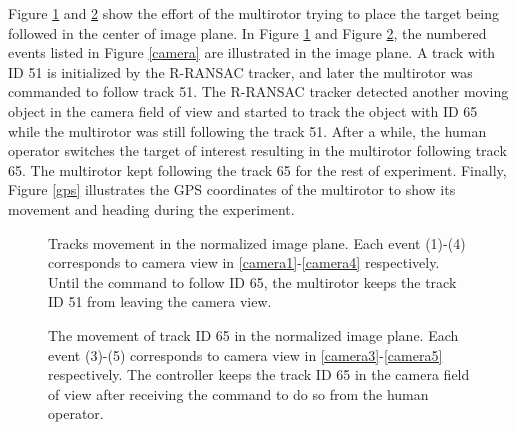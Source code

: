 Figure \ref{image1} and \ref{image2} show the effort of the multirotor trying to place the target being followed in the center of image plane. In Figure \ref{image1} and Figure \ref{image2}, the numbered events listed in Figure \ref{camera} are illustrated in the image plane. A track with ID 51 is initialized by the R-RANSAC tracker, and later the multirotor was commanded to follow track 51. The R-RANSAC tracker detected another moving object in the camera field of view and started to track the object with ID 65 while the multirotor was still following the track 51. After a while, the human operator switches the target of interest resulting in the multirotor following track 65. The multirotor kept following the track 65 for the rest of experiment. Finally, Figure \ref{gps} illustrates the GPS coordinates of the multirotor to show its movement and heading during the experiment. 

\begin{figure}[htbp]
	\centering
	\caption{Tracks movement in the normalized image plane. Each event (1)-(4) corresponds to camera view in \ref{camera1}-\ref{camera4} respectively. Until the command to follow ID 65, the multirotor keeps the track ID 51 from leaving the camera view.}
	\label{image1}
\end{figure}

\begin{figure}[htbp]
	\centering
	\caption{The movement of track ID 65 in the normalized image plane. Each event (3)-(5) corresponds to camera view in \ref{camera3}-\ref{camera5} respectively. The controller keeps the track ID 65 in the camera field of view after receiving the command to do so from the human operator.}
	\label{image2}
\end{figure}

